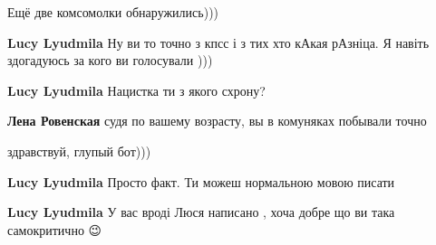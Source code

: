 \begin{itemize}
\begin{itemize}
Ещё две комсомолки обнаружились)))

 
\textbf{Lucy Lyudmila}
Ну ви то точно з кпсс і з тих хто кАкая рАзніца. Я навіть здогадуюсь за кого ви голосували )))

 
\textbf{Lucy Lyudmila} Нацистка ти з якого схрону?

 
\textbf{Лена Ровенская} судя по вашему возрасту, вы в комуняках побывали точно

 
здравствуй, глупый бот)))

 
\textbf{Lucy Lyudmila} Просто факт. Ти можеш нормальною мовою писати

 
\textbf{Lucy Lyudmila}
У вас вроді Люся написано , хоча добре що ви така самокритично 😉

 

\end{itemize}
\end{itemize}

